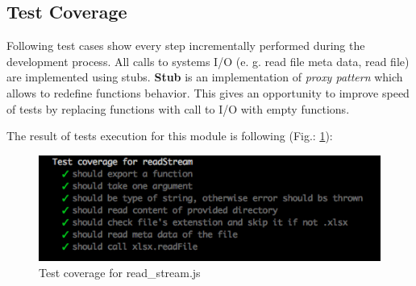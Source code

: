 \subsection{Test Coverage}
Following test cases show every step incrementally performed during the development process. All calls to systems I/O (e. g. read file meta data, read file) are implemented using stubs. \textbf{Stub} is an implementation of \textit{proxy pattern} which allows to redefine functions behavior. This gives an opportunity to improve speed of tests by replacing functions with call to I/O with empty functions.
%

The result of tests execution  for this module is following (Fig.: \ref{fig:testRead}):
\begin{figure}[H]
	\centering
	\includegraphics[width=\linewidth]{grafiken/testReadStream.png}
	\caption{Test coverage for read\_stream.js}
	\label{fig:testRead}
\end{figure}



